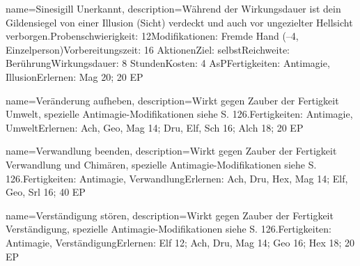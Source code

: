 {
    name={Sinesigill Unerkannt},
    description={Während der Wirkungsdauer ist dein Gildensiegel von einer Illusion (Sicht) verdeckt und auch vor ungezielter Hellsicht verborgen.\newline Probenschwierigkeit: 12\newline Modifikationen: Fremde Hand (–4, Einzelperson)\newline Vorbereitungszeit: 16 Aktionen\newline Ziel: selbst\newline Reichweite: Berührung\newline Wirkungsdauer: 8 Stunden\newline Kosten: 4 AsP\newline Fertigkeiten: Antimagie, Illusion\newline Erlernen: Mag 20; 20 EP}
}


{
    name={Veränderung aufheben},
    description={Wirkt gegen Zauber der Fertigkeit Umwelt, spezielle Antimagie-Modifikationen siehe S. 126.\newline Fertigkeiten: Antimagie, Umwelt\newline Erlernen: Ach, Geo, Mag 14; Dru, Elf, Sch 16; Alch 18; 20 EP}
}


{
    name={Verwandlung beenden},
    description={Wirkt gegen Zauber der Fertigkeit Verwandlung und Chimären, spezielle Antimagie-Modifikationen siehe S. 126.\newline Fertigkeiten: Antimagie, Verwandlung\newline Erlernen: Ach, Dru, Hex, Mag 14; Elf, Geo, Srl 16; 40 EP}
}


{
    name={Verständigung stören},
    description={Wirkt gegen Zauber der Fertigkeit Verständigung, spezielle Antimagie-Modifikationen siehe S. 126.\newline Fertigkeiten: Antimagie, Verständigung\newline Erlernen: Elf 12; Ach, Dru, Mag 14; Geo 16; Hex 18; 20 EP}
}


